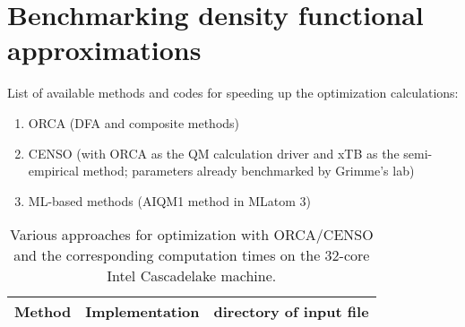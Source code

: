 \section{Benchmarking density functional approximations}
List of available methods and codes for speeding up the optimization calculations:
\begin{enumerate}
    \item ORCA (DFA and composite methods)
    \item CENSO (with ORCA as the QM calculation driver and xTB as the semi-empirical method; parameters already benchmarked by Grimme's lab)
    \item ML-based methods (AIQM1 method in MLatom 3)
\end{enumerate}
\begin{table}
\centering

\begin{tabular}{|c|c|c|} \hline
Method & Implementation & directory of input file \\ \hline

\end{tabular}
\caption{Various approaches for optimization with ORCA/CENSO and the corresponding computation times on the 32-core Intel Cascadelake machine.}
\end{table}